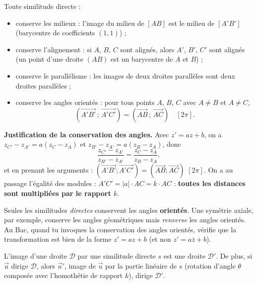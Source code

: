 \documentclass[11pt]{article}
\newcommand{\cle}[1]{{\popxbold\color{popdark}#1}}
\newcounter{popsec}
\newcounter{popsub}
\newcommand{\courssub}[1]{%
  \stepcounter{popsub}%
  \par\vspace{9pt}\noindent{\popxbold\fontsize{11.5}{13}\selectfont\color{popink}{\color{poporange}\thepopsec.\thepopsub}\hspace{6pt}#1}\par\nopagebreak\vspace{4pt}
}
\begin{document}
\begin{propriete}
Toute similitude directe :
\begin{itemize}
\item \cle{conserve les milieux} : l'image du milieu de $[AB]$ est le milieu de $[A'B']$ (barycentre de coefficients $(1,1)$) ;
\item \cle{conserve l'alignement} : si $A$, $B$, $C$ sont alignés, alors $A'$, $B'$, $C'$ sont alignés (un point d'une droite $(AB)$ est un barycentre de $A$ et $B$) ;
\item \cle{conserve le parallélisme} : les images de deux droites parallèles sont deux droites parallèles ;
\item \cle{conserve les angles orientés} : pour tous points $A$, $B$, $C$ avec $A \neq B$ et $A \neq C$,
\[ \left(\overrightarrow{A'B'}\,;\,\overrightarrow{A'C'}\right) = \left(\overrightarrow{AB}\,;\,\overrightarrow{AC}\right) \quad [2\pi]. \]
\end{itemize}
\end{propriete}

\textbf{Justification de la conservation des angles.} Avec $z' = az + b$, on a $z_{C'} - z_{A'} = a(z_C - z_A)$ et $z_{B'} - z_{A'} = a(z_B - z_A)$, donc
\[ \frac{z_{C'} - z_{A'}}{z_{B'} - z_{A'}} = \frac{z_C - z_A}{z_B - z_A}, \]
et en prenant les arguments : $(\overrightarrow{A'B'};\overrightarrow{A'C'}) = (\overrightarrow{AB};\overrightarrow{AC})$ $[2\pi]$. On a au passage l'égalité des modules : $A'C' = |a|\cdot AC = k \cdot AC$ : \textbf{toutes les distances sont multipliées par le rapport $k$}.

\begin{attention}
Seules les similitudes \emph{directes} conservent les angles \textbf{orientés}. Une symétrie axiale, par exemple, conserve les angles géométriques mais \emph{renverse} les angles orientés. Au Bac, quand tu invoques la conservation des angles orientés, vérifie que la transformation est bien de la forme $z' = az + b$ (et non $z' = a\bar{z} + b$).
\end{attention}

\courssub{Image d'une droite}

\begin{propriete}
L'image d'une droite $\mathcal{D}$ par une similitude directe $s$ est une droite $\mathcal{D}'$. De plus, si $\vec{u}$ dirige $\mathcal{D}$, alors $\vec{u}'$, image de $\vec{u}$ par la partie linéaire de $s$ (rotation d'angle $\theta$ composée avec l'homothétie de rapport $k$), dirige $\mathcal{D}'$.
\end{propriete}
\end{document}
